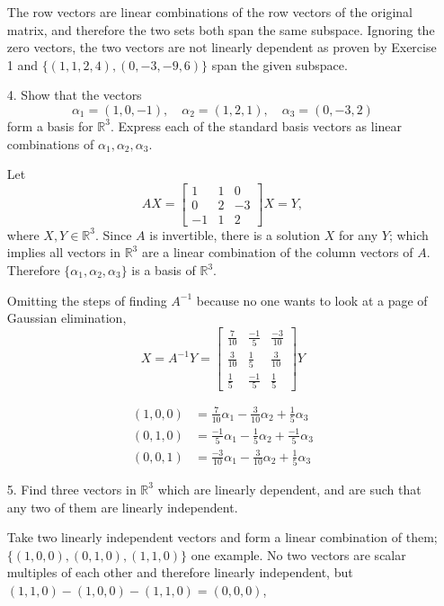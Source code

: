 \documentclass{article}
\begin{document}
\begin{enumerate}[listparindent=\parindent]
The row vectors are linear combinations of the row vectors of the original matrix,
and therefore the two sets both span the same subspace.
Ignoring the zero vectors, the two vectors are not linearly dependent as proven by Exercise 1
and \(\{(1, 1, 2, 4), (0, -3, -9, 6)\}\) span the given subspace.

\item[4.] Show that the vectors
    \[
        \alpha_1 = (1, 0, -1),\quad \alpha_2 = (1, 2, 1),\quad \alpha_3 = (0, -3, 2)
    \] form a basis for \(\mathbb{R}^3\). Express each of the standard basis vectors as linear combinations of \(\alpha_1, \alpha_2, \alpha_3\).

    Let
\[
    AX =
    \begin{bmatrix}
        1 & 1 & 0 \\
        0 & 2 & -3 \\
        -1 & 1 & 2
    \end{bmatrix}
    X = Y,
\] where \(X, Y \in \mathbb{R}^3\).
Since \(A\) is invertible, there is a solution \(X\) for any \(Y\);
which implies all vectors in \(\mathbb{R}^3\) are a linear combination of the column vectors of \(A\).
Therefore \(\{\alpha_1, \alpha_2, \alpha_3\}\) is a basis of \(\mathbb{R}^3\).

Omitting the steps of finding \(A^{-1}\) because no one wants to look at a page of Gaussian elimination,
\[
    X = A^{-1}Y =
    \begin{bmatrix}
        \frac{7}{10} & \frac{-1}{5} & \frac{-3}{10} \\
        \frac{3}{10} & \frac{1}{5} & \frac{3}{10} \\
        \frac{1}{5} & \frac{-1}{5} & \frac{1}{5}
    \end{bmatrix}Y
\]

\begin{align*}
    (1, 0, 0) &= \frac{7}{10}\alpha_1 - \frac{3}{10}\alpha_2 + \frac{1}{5}\alpha_3 \\
    (0, 1, 0) &= \frac{-1}{5}\alpha_1 - \frac{1}{5}\alpha_2 + \frac{-1}{5}\alpha_3 \\
    (0, 0, 1) &= \frac{-3}{10}\alpha_1 - \frac{3}{10}\alpha_2 + \frac{1}{5}\alpha_3
\end{align*}

\item[5.] Find three vectors in \(\mathbb{R}^3\) which are linearly dependent,
    and are such that any two of them are linearly independent.

Take two linearly independent vectors and form a linear combination of them;
\(\{(1, 0, 0), (0, 1, 0), (1, 1, 0)\}\) one example.
No two vectors are scalar multiples of each other and therefore linearly independent, but
\((1, 1, 0) - (1, 0, 0) - (1, 1, 0) = (0, 0, 0)\),


\end{enumerate}
\end{document}
